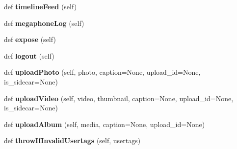 \begin{DoxyCompactItemize}
\item 
\mbox{\label{class_instagram_a_p_i_1_1_instagram_a_p_i_1_1_instagram_a_p_i_a4d269ed2f6c0a071e3ffc4d8cbbcff51}} 
def {\bfseries timeline\+Feed} (self)
\item 
\mbox{\label{class_instagram_a_p_i_1_1_instagram_a_p_i_1_1_instagram_a_p_i_a7f154ace2ac2583ccdc0342b72ca2ab1}} 
def {\bfseries megaphone\+Log} (self)
\item 
\mbox{\label{class_instagram_a_p_i_1_1_instagram_a_p_i_1_1_instagram_a_p_i_acb9ede5e40880a5da6c29ad962708f6b}} 
def {\bfseries expose} (self)
\item 
\mbox{\label{class_instagram_a_p_i_1_1_instagram_a_p_i_1_1_instagram_a_p_i_a1595fd881e4ffb8ec3a6c5167e75c9a2}} 
def {\bfseries logout} (self)
\item 
\mbox{\label{class_instagram_a_p_i_1_1_instagram_a_p_i_1_1_instagram_a_p_i_ae75b8e730c707cee0052c568f812441d}} 
def {\bfseries upload\+Photo} (self, photo, caption=None, upload\+\_\+id=None, is\+\_\+sidecar=None)
\item 
\mbox{\label{class_instagram_a_p_i_1_1_instagram_a_p_i_1_1_instagram_a_p_i_aa25eaeacae0e0d0ef3a7ef7ae33fd33f}} 
def {\bfseries upload\+Video} (self, video, thumbnail, caption=None, upload\+\_\+id=None, is\+\_\+sidecar=None)
\item 
\mbox{\label{class_instagram_a_p_i_1_1_instagram_a_p_i_1_1_instagram_a_p_i_aa792a273229935ebe6ae5f6264cd28e2}} 
def {\bfseries upload\+Album} (self, media, caption=None, upload\+\_\+id=None)
\item 
\mbox{\label{class_instagram_a_p_i_1_1_instagram_a_p_i_1_1_instagram_a_p_i_ae33c4ec9047c9d0eb84ffe2b9a093c31}} 
def {\bfseries throw\+If\+Invalid\+Usertags} (self, usertags)

\end{DoxyCompactItemize}
